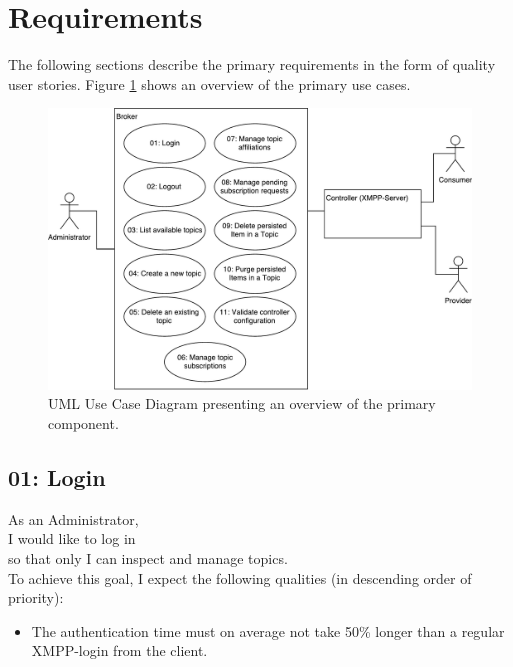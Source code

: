 
\section{Requirements}\label{sec:requirements}

The following sections describe the primary requirements in the form of quality user stories.
Figure \ref{fig:requirements-overview} shows an overview of the primary use cases.

\begin{figure}[h]
    \centering
    \includegraphics[width=1\linewidth]{resources/requirements_overview}
    \caption{UML Use Case Diagram presenting an overview of the primary component.}
    \label{fig:requirements-overview}
\end{figure}


\subsection{01: Login}

As an Administrator,\\
I would like to log in\\
so that only I can inspect and manage topics.\\
To achieve this goal, I expect the following qualities (in descending order of priority):

\begin{itemize}
    \item The authentication time must on average not take 50\% longer than a regular XMPP-login from the client.
\end{itemize}

